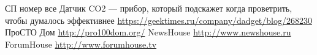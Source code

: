 \begin{thebibliography}{99}
  { СП номер все }
 {\small Датчик CO2 — прибор, который подскажет когда проветрить, чтобы думалось эффективнее } \newline \url{https://geektimes.ru/company/dadget/blog/268230}
  {\small ПроСТО Дом }  \newline \url{http://pro100dom.org/}
  {\small NewsHouse }   \newline \url{http://www.newshouse.ru}
 {\small ForumHouse } \newline \url{http://www.forumhouse.tv}
\end{thebibliography}
